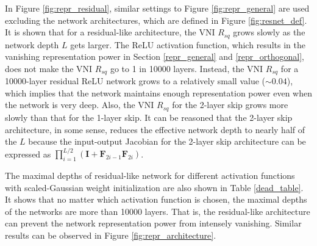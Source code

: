 In Figure \ref{fig:repr_residual}, similar settings to Figure \ref{fig:repr_general} are 
used excluding the network architectures, which are defined in Figure \ref{fig:resnet_def}.
It is shown that for a residual-like architecture, the VNI $R_{sq}$ grows slowly as the network
depth $L$ gets larger. The ReLU activation function, which results in the vanishing representation
power in Section \ref{repr_general} and \ref{repr_orthogonal}, does not make the VNI $R_{sq}$ go
to 1 in 10000 layers. Instead, the VNI $R_{sq}$ for a 10000-layer residual ReLU network grows to a
relatively small value ($\sim0.04$), which implies that the network maintains enough representation
power even when the network is very deep.
Also, the VNI $R_{sq}$ for the 2-layer skip grows more slowly than that for the 1-layer skip. It 
can be reasoned that the 2-layer skip architecture, in some sense, reduces the effective network depth
to nearly half of the $L$ because the input-output Jacobian for the 2-layer skip architecture can be
expressed as $\prod_{i=1}^{L/2}(\mathbf{I}+\mathbf{F}_{2i-1}\mathbf{F}_{2i})$.

The maximal depths of residual-like network for different activation functions with scaled-Gaussian
weight initialization are also shown in Table \ref{dead_table}.
It shows that no matter which activation function is chosen, the maximal depths of the networks are
more than 10000 layers. That is, the residual-like architecture can prevent the network representation
power from intensely vanishing. Similar results can be observed in Figure \ref{fig:repr_architecture}.

